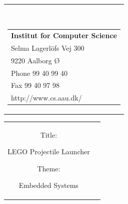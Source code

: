

{}
\thispagestyle{empty}
\begin{nopagebreak}
{\samepage 
\begin{tabular}{r}
\parbox{\textwidth}{  \\
\hfill \parbox{8cm}{\begin{tabular}{l} %
{\small \textbf{Institut for Computer Science}}\\
{\small Selma Lagerlöfs Vej 300} \\
{\small 9220 Aalborg Ø} \\
{\small Phone 99 40 99 40} \\
{\small Fax 99 40 97 98} \\
{\small http://www.cs.aau.dk/}
\end{tabular}}}

\end{tabular}

\begin{tabular}{cc}
\parbox{7cm}{
\begin{description}

\item { Title:} 

LEGO Projectile Launcher \\
  
\item { Theme:} 

Embedded Systems

\end{description}

\parbox{8cm}{

}}
\end{tabular}}
\end{nopagebreak}
